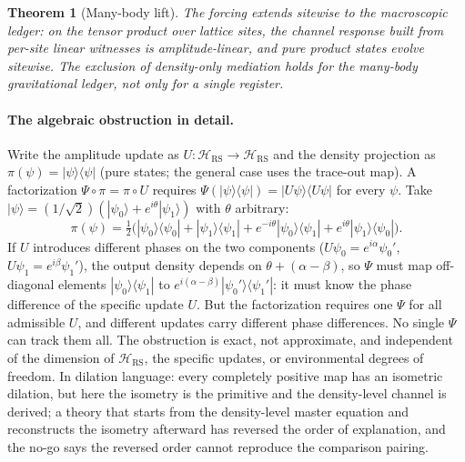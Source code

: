 \documentclass[11pt,letterpaper]{article}
\newtheorem{theorem}{Theorem}[section]
\begin{document}
\begin{theorem}[Many-body lift]
\label{thm:manybody}
The forcing extends sitewise to the macroscopic ledger: on the tensor product over lattice sites, the channel response built from per-site linear witnesses is amplitude-linear, and pure product states evolve sitewise. The exclusion of density-only mediation holds for the many-body gravitational ledger, not only for a single register.
\end{theorem}

\paragraph{The algebraic obstruction in detail.} Write the amplitude update as $U:\mathcal{H}_{\mathrm{RS}}\to\mathcal{H}_{\mathrm{RS}}$ and the density projection as $\pi(\psi)=|\psi\rangle\langle\psi|$ (pure states; the general case uses the trace-out map). A factorization $\Psi\circ\pi=\pi\circ U$ requires $\Psi(|\psi\rangle\langle\psi|)=|U\psi\rangle\langle U\psi|$ for every $\psi$. Take $|\psi\rangle=(1/\sqrt{2})(|\psi_{0}\rangle+e^{i\theta}|\psi_{1}\rangle)$ with $\theta$ arbitrary:
\begin{equation}
\pi(\psi)=\tfrac12\bigl(|\psi_{0}\rangle\langle\psi_{0}|+|\psi_{1}\rangle\langle\psi_{1}|+e^{-i\theta}|\psi_{0}\rangle\langle\psi_{1}|+e^{i\theta}|\psi_{1}\rangle\langle\psi_{0}|\bigr).
\label{eq:density}
\end{equation}
If $U$ introduces different phases on the two components ($U\psi_{0}=e^{i\alpha}\psi_{0}'$, $U\psi_{1}=e^{i\beta}\psi_{1}'$), the output density depends on $\theta+(\alpha-\beta)$, so $\Psi$ must map off-diagonal elements $|\psi_{0}\rangle\langle\psi_{1}|$ to $e^{i(\alpha-\beta)}|\psi_{0}'\rangle\langle\psi_{1}'|$: it must know the phase difference of the specific update $U$. But the factorization requires one $\Psi$ for all admissible $U$, and different updates carry different phase differences. No single $\Psi$ can track them all. The obstruction is exact, not approximate, and independent of the dimension of $\mathcal{H}_{\mathrm{RS}}$, the specific updates, or environmental degrees of freedom. In dilation language: every completely positive map has an isometric dilation, but here the isometry is the primitive and the density-level channel is derived; a theory that starts from the density-level master equation and reconstructs the isometry afterward has reversed the order of explanation, and the no-go says the reversed order cannot reproduce the comparison pairing.
\end{document}
